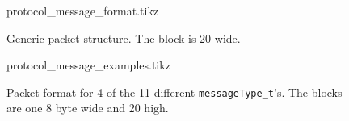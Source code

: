 \documentclass[final]{article}
\begin{document}
\begin{figure}[H]
\centering
    {protocol_message_format.tikz}
    \caption{Generic packet structure. The block is \SI{20}{\byte} wide.}
    \label{fig:packet-format}
\end{figure}
\begin{figure}[H]
\centering
    {protocol_message_examples.tikz}
    \caption{Packet format for 4 of the 11 different \texttt{messageType\_t}'s. The blocks are one \SI{8}{\bit} byte wide and \SI{20}{\byte} high.}
    \label{fig:packet-examples}
\end{figure}
\end{document}
